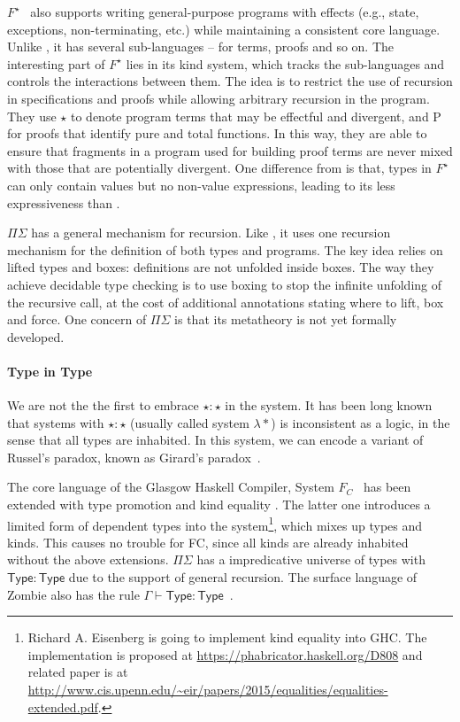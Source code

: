$F^{\star}$~\cite{Swamy2011} also supports writing general-purpose
programs with effects (e.g., state, exceptions, non-terminating, etc.)
while maintaining a consistent core language. Unlike \name, it has
several sub-languages -- for terms, proofs and so on. The interesting
part of $F^{\star}$ lies in its kind system, which tracks the
sub-languages and controls the interactions between them. The idea is
to restrict the use of recursion in specifications and proofs while
allowing arbitrary recursion in the program. They use $\star$ to
denote program terms that may be effectful and divergent, and
\textsf{P} for proofs that identify pure and total functions. In this
way, they are able to ensure that fragments in a program used for
building proof terms are never mixed with those that are potentially
divergent. One difference from \name is that, types in $F^{\star}$ can
only contain values but no non-value expressions, leading to its less
expressiveness than \name.

$\Pi\Sigma$ has a general mechanism for recursion. Like \name, it uses
one recursion mechanism for the definition of both types and
programs. The key idea relies on lifted types and boxes: definitions
are not unfolded inside boxes. The way they achieve decidable type
checking is to use boxing to stop the infinite unfolding of the
recursive call, at the cost of additional annotations stating where to
lift, box and force. One concern of $\Pi\Sigma$ is that its metatheory
is not yet formally developed.

\paragraph{Type in Type}
We are not the the first to embrace $\star : \star$ in the system. It
has been long known that systems with $\star : \star$ (usually called
system $\lambda *$) is inconsistent as a logic, in the sense that all
types are inhabited. In this system, we can encode a variant of
Russel's paradox, known as Girard's
paradox~\cite{coquand1986analysis}.

The core language of the Glasgow Haskell Compiler, System $F_{C}$~\cite{fc}
has been extended with type promotion \cite{fc:pro} and kind equality
\cite{fc:kind}. The latter one introduces a limited form of dependent
types into the system\footnote{Richard A. Eisenberg is going to
  implement kind equality \cite{fc:kind} into GHC. The implementation
  is proposed at \url{https://phabricator.haskell.org/D808} and
  related paper is at
  \url{http://www.cis.upenn.edu/~eir/papers/2015/equalities/equalities-extended.pdf}.},
which mixes up types and kinds. This causes no trouble for FC, since
all kinds are already inhabited without the above
extensions. $\Pi\Sigma$ has a impredicative universe of types with
$\mathsf{Type} : \mathsf{Type}$ due to the support of general
recursion. The surface language of Zombie also has the rule
$\Gamma \vdash \mathsf{Type} : \mathsf{Type}$~\cite{zombie:popl15}.

